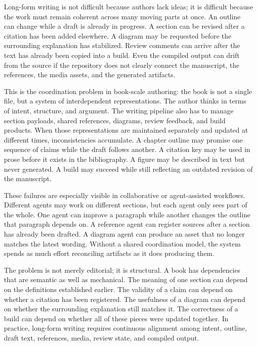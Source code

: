 \documentclass[11pt]{article}
\begin{document}

Long-form writing is not difficult because authors lack ideas; it is difficult because the work must remain coherent across many moving parts at once. An outline can change while a draft is already in progress. A section can be revised after a citation has been added elsewhere. A diagram may be requested before the surrounding explanation has stabilized. Review comments can arrive after the text has already been copied into a build. Even the compiled output can drift from the source if the repository does not clearly connect the manuscript, the references, the media assets, and the generated artifacts.

This is the coordination problem in book-scale authoring: the book is not a single file, but a system of interdependent representations. The author thinks in terms of intent, structure, and argument. The writing pipeline also has to manage section payloads, shared references, diagrams, review feedback, and build products. When those representations are maintained separately and updated at different times, inconsistencies accumulate. A chapter outline may promise one sequence of claims while the draft follows another. A citation key may be used in prose before it exists in the bibliography. A figure may be described in text but never generated. A build may succeed while still reflecting an outdated revision of the manuscript.

These failures are especially visible in collaborative or agent-assisted workflows. Different agents may work on different sections, but each agent only sees part of the whole. One agent can improve a paragraph while another changes the outline that paragraph depends on. A reference agent can register sources after a section has already been drafted. A diagram agent can produce an asset that no longer matches the latest wording. Without a shared coordination model, the system spends as much effort reconciling artifacts as it does producing them.

The problem is not merely editorial; it is structural. A book has dependencies that are semantic as well as mechanical. The meaning of one section can depend on the definitions established earlier. The validity of a claim can depend on whether a citation has been registered. The usefulness of a diagram can depend on whether the surrounding explanation still matches it. The correctness of a build can depend on whether all of these pieces were updated together. In practice, long-form writing requires continuous alignment among intent, outline, draft text, references, media, review state, and compiled output.
\end{document}
